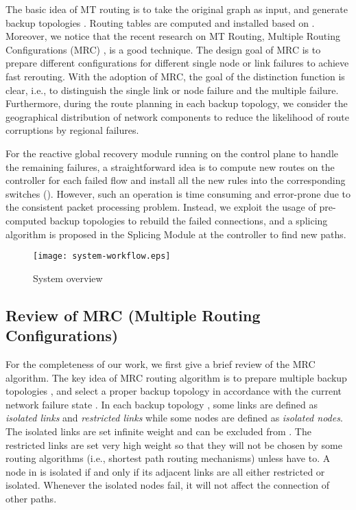 \documentclass[10pt,journal]{IEEEtran}
\begin{document}
The basic idea of MT routing is to take the original graph  as input, and generate  backup topologies . Routing tables  are computed and installed based on . Moreover, we notice that the recent research on MT Routing, Multiple Routing Configurations (MRC) \cite{kvalbein2009multiple,kvalbein2006fast}, is a good technique. The design goal of MRC is to prepare different configurations for different single node or link failures to achieve fast rerouting. With the adoption of MRC, the goal of the distinction function is clear, i.e., to distinguish the single link or node failure and the multiple failure. Furthermore, during the route planning in each backup topology, we consider the geographical distribution of network components to reduce the likelihood of route corruptions by regional failures.

For the reactive global recovery module running on the control plane to handle the remaining failures, a straightforward idea is to compute new routes on the controller for each failed flow and install all the new rules into the corresponding switches (\cite{staessens2011software,sharma2012openflow,nguyen2013software}). However, such an operation is time consuming and error-prone due to the consistent packet processing problem\cite{katta2013incremental,peresini2013cpp}. Instead, we exploit the usage of pre-computed backup topologies to rebuild the failed connections, and a splicing algorithm is proposed in the Splicing Module at the controller to find new paths.

\begin{figure}[!h]
\begin{center}
		\texttt{[image: system-workflow.eps]}
	\caption{System overview}
	\label{fig:system_workflow}
\end{center}
\end{figure}
\subsection{Review of MRC (Multiple Routing Configurations)}
For the completeness of our work, we first give a brief review of the MRC algorithm. The key idea of MRC routing algorithm is to prepare multiple backup topologies , and select a proper backup topology in accordance with the current network failure state \cite{kvalbein2006fast}. In each backup topology , some links  are defined as \emph{isolated links} and  \emph{restricted links} while some nodes  are defined as \emph{isolated nodes}. The isolated links are set infinite weight and can be excluded from . The restricted links are set very high weight so that they will not be chosen by some routing algorithms (i.e., shortest path routing mechanisms) unless have to. A node  in  is isolated if and only if its adjacent links are all either restricted or isolated.  Whenever the isolated nodes fail, it will not affect the connection of other paths.
\end{document}

